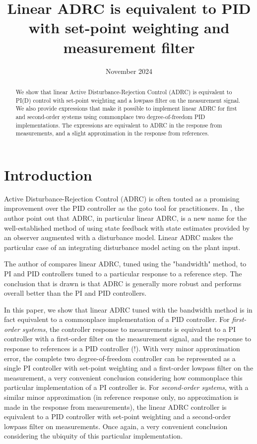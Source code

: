 \documentclass[letterpaper, 10 pt, conference]{ieeeconf}
\title{Linear ADRC is equivalent to PID with set-point weighting and measurement filter}
\date{November 2024}
\begin{document}
\maketitle

\begin{abstract}
We show that linear Active Disturbance-Rejection Control (ADRC) is equivalent to PI(D) control with set-point weighting and a lowpass filter on the measurement signal. We also provide expressions that make it possible to implement linear ADRC for first and second-order systems using commonplace two degree-of-freedom PID implementations. The expressions are equivalent to ADRC in the response from measurements, and a slight approximation in the response from references.
\end{abstract}


\section{Introduction}
Active Disturbance-Rejection Control (ADRC) is often touted as a promising improvement over the PID controller as the goto tool for practitioners. In \cite{herbst2013simulative}, the author point out that ADRC, in particular linear ADRC, is a new name for the well-established method of using state feedback with state estimates provided by an observer augmented with a disturbance model. Linear ADRC makes the particular case of an integrating disturbance model acting on the plant input. 

The author of \cite{herbst2013simulative} compares linear ADRC, tuned using the "bandwidth" method, to PI and PID controllers tuned to a particular response to a reference step. The conclusion that is drawn is that ADRC is generally more robust and performs overall better than the PI and PID controllers.

In this paper, we show that linear ADRC tuned with the bandwidth method is in fact equivalent to a commonplace implementation of a PID controller. For \emph{first-order systems}, the controller response to measurements is equivalent to a PI controller with a first-order filter on the measurement signal, and the response to response to references is a PID controller (!). With very minor approximation error, the complete two degree-of-freedom controller can be represented as a single PI controller with set-point weighting and a first-order lowpass filter on the measurement, a very convenient conclusion considering how commonplace this particular implementation of a PI controller is. For \emph{second-order systems}, with a similar minor approximation (in reference response only, no approximation is made in the response from measurements), the linear ADRC controller is equivalent to a PID controller with set-point weighting and a second-order lowpass filter on measurements. Once again, a very convenient conclusion considering the ubiquity of this particular implementation.
\end{document}
